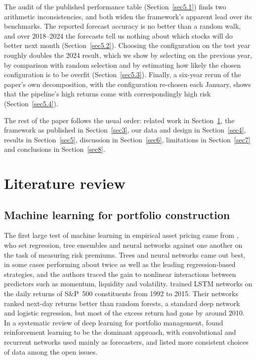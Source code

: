 The audit of the published performance table (Section~\ref{sec5.1}) finds two arithmetic inconsistencies, and both widen the framework's apparent lead over its benchmarks. The reported forecast accuracy is no better than a random walk, and over 2018--2024 the forecasts tell us nothing about which stocks will do better next month (Section~\ref{sec5.2}). Choosing the configuration on the test year roughly doubles the 2024 result, which we show by selecting on the previous year, by comparison with random selection and by estimating how likely the chosen configuration is to be overfit (Section~\ref{sec5.3}). Finally, a six-year rerun of the paper's own decomposition, with the configuration re-chosen each January, shows that the pipeline's high returns come with correspondingly high risk (Section~\ref{sec5.4}).

The rest of the paper follows the usual order: related work in Section~\ref{sec2}, the framework as published in Section~\ref{sec3}, our data and design in Section~\ref{sec4}, results in Section~\ref{sec5}, discussion in Section~\ref{sec6}, limitations in Section~\ref{sec7} and conclusions in Section~\ref{sec8}.

\section{Literature review}\label{sec2}

\subsection{Machine learning for portfolio construction}

The first large test of machine learning in empirical asset pricing came from \citet{gu2020}, who set regression, tree ensembles and neural networks against one another on the task of measuring risk premiums. Trees and neural networks came out best, in some cases performing about twice as well as the leading regression-based strategies, and the authors traced the gain to nonlinear interactions between predictors such as momentum, liquidity and volatility. \citet{fischer2018} trained LSTM networks \citep{hochreiter1997} on the daily returns of S\&P~500 constituents from 1992 to 2015. Their networks ranked next-day returns better than random forests, a standard deep network and logistic regression, but most of the excess return had gone by around 2010. In a systematic review of deep learning for portfolio management, \citet{novykov2025} found reinforcement learning to be the dominant approach, with convolutional and recurrent networks used mainly as forecasters, and listed more consistent choices of data among the open issues.

